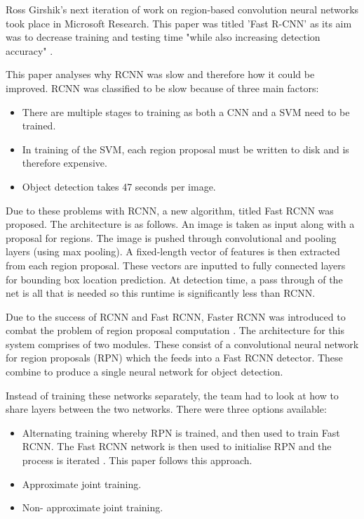 Ross Girshik's next iteration of work on region-based convolution neural
networks took place in Microsoft Research. This paper was titled 'Fast R-CNN' as
its aim was to decrease training and testing time "while also increasing
detection accuracy" \parencite{fastRcnn}.

This paper analyses why RCNN \parencite{rcnn} was slow and therefore how it could be improved.
RCNN was classified to be slow because of three main factors:
\begin{itemize}
	\item{There are multiple stages to training as both a CNN and a SVM need to
		be trained.}
	\item{In training of the SVM, each region proposal must be written to disk
		and is therefore expensive.}
	\item{Object detection takes 47 seconds per image.}
\end{itemize}

Due to these problems with RCNN, a new algorithm, titled Fast RCNN was proposed.
The architecture is as follows. An image is taken as input along with a
proposal for regions. The image is pushed through convolutional and pooling
layers (using max pooling). A fixed-length vector of features is then extracted
from each region proposal. These vectors are inputted to fully connected
layers for bounding box location prediction.
At detection time, a pass through of the net is all that is needed so this
runtime is significantly less than RCNN.

Due to the success of RCNN and Fast RCNN, Faster RCNN was introduced to combat
the problem of region proposal computation \parencite{fasterRcnn}.
The architecture for this system comprises of two modules. These consist of a
convolutional neural network for region proposals (RPN) which the feeds into a Fast
RCNN detector. These combine to produce a single neural network for object
detection.

Instead of training these networks separately, the team had to look at how to
share layers between the two networks. There were three options available:
\begin{itemize}
    \item{Alternating training whereby RPN is trained, and then used to train
        Fast RCNN. The Fast RCNN network is then used to initialise RPN and the
		process is iterated \parencite{fasterRcnn}. This paper follows this approach.}
    \item{Approximate joint training.}
    \item{Non- approximate joint training.}
\end{itemize}

